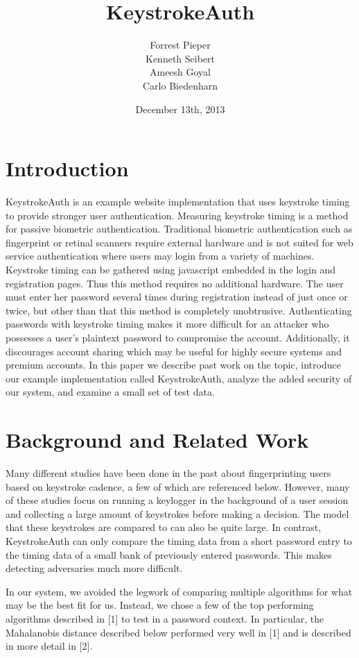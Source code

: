 \documentclass{article}
\title{KeystrokeAuth}
\author{
  Forrest Pieper\\
  Kenneth Seibert\\
  Ameesh Goyal\\
  Carlo Biedenharn
}
\date{December 13th, 2013}
\begin{document}
\maketitle

\abstract{
}

\section{Introduction}
\label{introduction}
KeystrokeAuth is an example website implementation that uses keystroke timing to provide stronger user authentication.
Measuring keystroke timing is a method for passive biometric authentication. 
Traditional biometric authentication such as fingerprint or retinal scanners require external hardware and is not suited for web service authentication where users may login from a variety of machines. 
Keystroke timing can be gathered using javascript embedded in the login and registration pages.
Thus this method requires no additional hardware.
The user must enter her password several times during registration instead of just once or twice, but other than that this method is completely unobtrusive.
Authenticating passwords with keystroke timing makes it more difficult for an attacker who possesses a user's plaintext password to compromise the account.
Additionally, it discourages account sharing which may be useful for highly secure systems and premium accounts.
In this paper we describe past work on the topic, introduce our example implementation called KeystrokeAuth, analyze the added security of our system, and examine a small set of test data.

\section{Background and Related Work}

Many different studies have been done in the past about fingerprinting users based on keystroke cadence, a few of which are referenced below. However, many of these studies focus on running a keylogger in the background of a user session and collecting a large amount of keystrokes before making a decision. The model that these keystrokes are compared to can also be quite large. In contrast, KeystrokeAuth can only compare the timing data from a short password entry to the timing data of a small bank of previously entered passwords. This makes detecting adversaries much more difficult.

In our system, we avoided the legwork of comparing multiple algorithms for what may be the best fit for us. Instead, we chose a few of the top performing algorithms described in {[}1{]} to test in a password context. In particular, the Mahalanobis distance described below performed very well in {[}1{]} and is described in more detail in {[}2{]}. 
\end{document}
